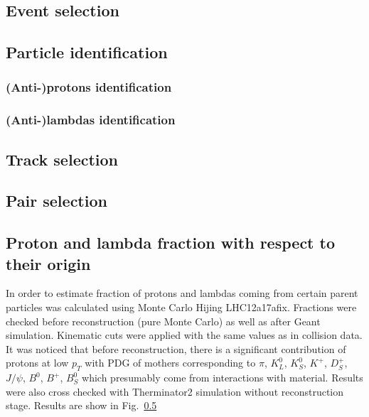 \documentclass[ALICE,manyauthors]{ALICE_analysis_notes}
\begin{document}
\subsection{Event selection}

\subsection{Particle identification}

\subsubsection{(Anti-)protons identification}

\subsubsection{(Anti-)lambdas identification}

\subsection{Track selection}

\subsection{Pair selection}

\subsection{Proton and lambda fraction with respect to their origin}
In order to estimate fraction of protons and lambdas coming from certain parent particles was calculated using Monte Carlo Hijing LHC12a17afix. Fractions were checked before reconstruction (pure Monte Carlo) as well as after Geant simulation. Kinematic cuts were applied with the same values as in collision data. It was noticed that before reconstruction, there is a significant contribution of protons at low $p_{T}$  with PDG of mothers corresponding to $\pi$, $K^0_L$, $K^0_S$, $K^+$, $D^+_S$, $J/\psi$, $B^0$, $B^+$, $B^0_S$ which presumably come from interactions with material. Results were also cross checked with Therminator2 simulation without reconstruction stage. Results are show in Fig.~\ref{}
\end{document}
